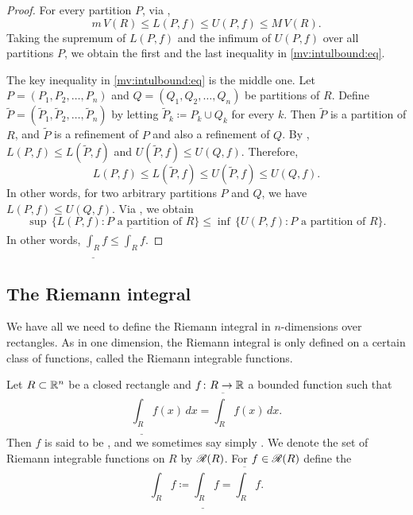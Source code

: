 \begin{proof}
For every partition $P$, via ,
\begin{equation*}
m\,V(R) \leq L(P,f) \leq U(P,f) \leq M\,V(R).
\end{equation*}
Taking the supremum of $L(P,f)$ and the infimum of $U(P,f)$ over all partitions $P$,
we obtain the first and the last inequality in
\eqref{mv:intulbound:eq}.

The key inequality in
\eqref{mv:intulbound:eq}
is the middle one.
Let $P=(P_1,P_2,\ldots,P_n)$ and
$Q=(Q_1,Q_2,\ldots,Q_n)$
be partitions of $R$.  Define 
$\widetilde{P} = ( \widetilde{P}_1,\widetilde{P}_2,\ldots,\widetilde{P}_n )$
by letting
$\widetilde{P}_k \coloneqq P_k \cup Q_k$ for every $k$.
Then $\widetilde{P}$ is a partition of $R$,
and $\widetilde{P}$ is a refinement of $P$ and also a refinement of $Q$.
By ,
$L(P,f) \leq L(\widetilde{P},f)$ and
$U(\widetilde{P},f) \leq U(Q,f)$.  Therefore,
\begin{equation*}
L(P,f) \leq L(\widetilde{P},f) \leq U(\widetilde{P},f) \leq U(Q,f) .
\end{equation*}
In other words, for two arbitrary partitions $P$ and $Q$, we have
$L(P,f) \leq U(Q,f)$.  
Via ,
we obtain
\begin{equation*}
\sup \, \bigl\{ L(P,f) : P \text{ a partition of } R \bigr\}
\leq
\inf \, \bigl\{ U(P,f) : P \text{ a partition of } R \bigr\} .
\end{equation*}
In other words, $\underline{\int_R} f \leq \overline{\int_R} f$.
\end{proof}

\subsection{The Riemann integral}

We have all we need to
define the Riemann integral in $n$-dimensions over rectangles.
As in one dimension, the Riemann
integral is only defined on a certain class of functions, called the
Riemann integrable functions.

\begin{defn}
Let $R \subset {\mathbb{R}}^n$ be a closed rectangle and
$f \colon R \to {\mathbb{R}}$ a bounded function such that
\begin{equation*}
\underline{\int_R} f(x)\,dx = \overline{\int_R} f(x)\,dx .
\end{equation*}
Then $f$ is said to be \emph{},
and we sometimes say simply \emph{}.
We denote the set of Riemann integrable functions on $R$
by ${\mathscr{R}}(R)$.
For $f \in {\mathscr{R}}(R)$ define
the \emph{}
\begin{equation*}
\int_R f \coloneqq 
\underline{\int_R} f = \overline{\int_R} f .
\end{equation*}
\end{defn}

